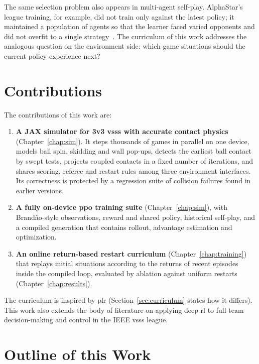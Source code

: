 The same selection problem also appears in multi-agent self-play.  AlphaStar's
league training, for example, did not train only against the latest policy; it
maintained a population of agents so that the learner faced varied opponents and
did not overfit to a single strategy~\cite{starcraft_marl}.  The curriculum of this work addresses the analogous question on the environment side: which game
situations should the current policy experience next?

\section{Contributions}
\label{sec:contributions}

The contributions of this work are:
\begin{enumerate}
  \item \textbf{A JAX simulator for 3v3 \gls{vsss} with accurate contact physics} (Chapter~\ref{chap:sim}).  It steps thousands of games in parallel on one device, models ball spin, skidding and wall pop-ups,
        detects the earliest ball contact by swept tests, projects coupled contacts in a fixed number of iterations, and shares scoring, referee and restart rules among three environment interfaces.
        Its correctness is protected by a regression suite of collision failures found in earlier versions.
  \item \textbf{A fully on-device \gls{ppo} training suite} (Chapter~\ref{chap:sim}), with Brand\~ao-style observations, reward and shared policy, historical self-play, and a compiled generation that
        contains rollout, advantage estimation and optimization.
  \item \textbf{An online return-based restart curriculum} (Chapter~\ref{chap:training}) that replays initial situations according to the returns of recent episodes inside the compiled loop, evaluated by ablation
        against uniform restarts (Chapter~\ref{chap:results}).
\end{enumerate}
The curriculum is inspired by \gls{plr} (Section~\ref{sec:curriculum} states how it differs).
This work also extends the body of literature on applying deep \gls{rl} to full-team decision-making and control in the IEEE \gls{vsss} league.

\section{Outline of this Work}

